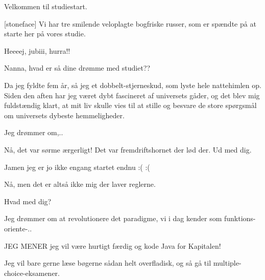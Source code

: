 \documentclass[a4paper,11pt]{article}
\begin{document}
\begin{sketch}


 Velkommen til studiestart.

[stoneface] Vi har tre smilende veloplagte bogfriske russer,
som er spændte på at starte her på vores studie.


 Heeeej, jubiii, hurra!!



 Nanna, hvad er så dine drømme med studiet??


 Da jeg fyldte fem år, så jeg et dobbelt-stjerneskud, som lyste hele
nattehimlen op.  Siden den aften har jeg været dybt fascineret af universets
gåder, og det blev mig fuldstændig klart, at mit liv skulle vies til at stille
og besvare de store spørgsmål om universets dybeste hemmeligheder. 

 Jeg drømmer om,..


 Nå, det var sørme ærgerligt!  Det var fremdriftshornet der
lød der.  Ud med dig.

 Jamen jeg er jo ikke engang startet endnu :( :(

 Nå, men det er altså ikke mig der laver reglerne.



 Hvad med dig?

 Jeg drømmer om at revolutionere det paradigme, vi i dag kender som
funktions-oriente-..


  JEG MENER jeg vil være hurtigt færdig og kode
Java for Kapitalen!



 Jeg vil bare gerne læse bøgerne sådan helt overfladisk, og
så gå til multiple-choice-eksamener.


\end{sketch}
\end{document}
